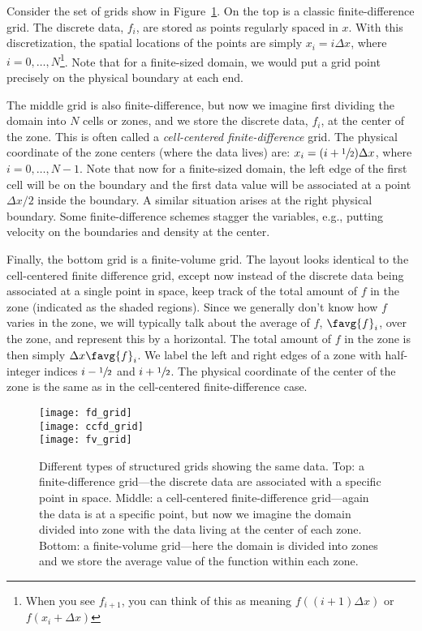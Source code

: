 Consider the set of grids show in Figure~\ref{fig:grids}.  On the top
is a classic finite-difference grid.  The discrete data, $f_i$, are
stored as points regularly spaced in $x$.  With this discretization,
the spatial locations of the points are simply $x_i = i \Delta x$,
where $i = 0, \ldots, N$\footnote{When you see $f_{i+1}$, you can
  think of this as meaning $f((i+1)\Delta x)$ or $f(x_i + \Delta x)$}.
Note that for a finite-sized domain, we would put a grid point
precisely on the physical boundary at each end.

The middle grid is also finite-difference, but now we imagine first
dividing the domain into $N$ cells or zones, and we store the discrete
data, $f_i$, at the center of the zone.  This is often called a {\em
  cell-centered finite-difference} grid.  The physical coordinate of
the zone centers (where the data lives) are: $x_i = (i + {\sfrac{1}{2}})\Delta
x$, where $i = 0, \ldots, N-1$.  Note that now for a finite-sized
domain, the left edge of the first cell will be on the boundary and
the first data value will be associated at a point $\Delta x/2$ inside
the boundary.  A similar situation arises at the right physical
boundary.  Some finite-difference schemes stagger the variables,
e.g., putting velocity on the boundaries and density at the center.

Finally, the bottom grid is a finite-volume grid.  The layout looks
identical to the cell-centered finite difference grid, except now
instead of the discrete data being associated at a single point in
space, keep track of the total amount of $f$ in the zone (indicated as the shaded regions).  Since we generally don't know how $f$ varies in the zone,
we will typically talk about the average of $f$, $\favg{f}_i$, over
the zone, and represent this by a horizontal.  The total amount of $f$ in
the zone is then simply $\Delta x \favg{f}_i$.
We label the left and right edges of a zone with half-integer indices
$i-{\sfrac{1}{2}}$ and $i+{\sfrac{1}{2}}$.  The physical coordinate of the center of the zone
is the same as in the cell-centered finite-difference case.


\begin{figure}[t]
\centering
\texttt{[image: fd\_grid]} \\
\texttt{[image: ccfd\_grid]} \\
\texttt{[image: fv\_grid]}
\caption[Types of structured grids]{\label{fig:grids} Different types of structured grids showing
  the same data.  Top:
  a finite-difference grid---the discrete data are associated with a
  specific point in space.  Middle: a cell-centered finite-difference
  grid---again the data is at a specific point, but now we imagine the
  domain divided into zone with the data living at the center of each
  zone.  Bottom: a finite-volume grid---here the domain is divided
  into zones and we store the average value of the function within
  each zone.}
\end{figure}

